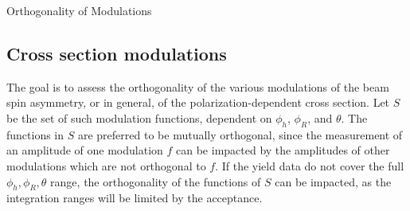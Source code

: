 \documentclass[12pt]{article}
\begin{document}
\begin{center}
{\LARGE 
Orthogonality of Modulations
}
\end{center}

\subsection*{Cross section modulations}


The goal is to assess the orthogonality of the various modulations of the beam
spin asymmetry, or in general, of the polarization-dependent cross section. Let
$S$ be the set of such modulation functions, dependent on $\phi_h$, $\phi_R$,
and $\theta$. The functions in $S$ are preferred to be mutually orthogonal,
since the measurement of an amplitude of one modulation $f$ can be impacted by
the amplitudes of other modulations which are not orthogonal to $f$.  If the
yield data do not cover the full $\phi_h,\phi_R,\theta$ range, the orthogonality
of the functions of $S$ can be impacted, as the integration ranges will be
limited by the acceptance. 
\end{document}
